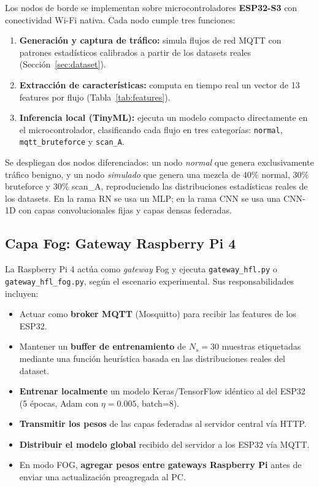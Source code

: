 Los nodos de borde se implementan sobre microcontroladores \textbf{ESP32-S3} con conectividad Wi-Fi nativa. Cada nodo cumple tres funciones:
\begin{enumerate}[noitemsep, topsep=0pt]
    \item \textbf{Generación y captura de tráfico:} simula flujos de red MQTT con patrones estadísticos calibrados a partir de los datasets reales (Sección~\ref{sec:dataset}).
    \item \textbf{Extracción de características:} computa en tiempo real un vector de 13 features por flujo (Tabla~\ref{tab:features}).
    \item \textbf{Inferencia local (TinyML):} ejecuta un modelo compacto directamente en el microcontrolador, clasificando cada flujo en tres categorías: \texttt{normal}, \texttt{mqtt\_bruteforce} y \texttt{scan\_A}.
\end{enumerate}

Se despliegan dos nodos diferenciados: un nodo \emph{normal} que genera exclusivamente tráfico benigno, y un nodo \emph{simulado} que genera una mezcla de 40\% normal, 30\% bruteforce y 30\% scan\_A, reproduciendo las distribuciones estadísticas reales de los datasets. En la rama RN se usa un MLP; en la rama CNN se usa una CNN-1D con capas convolucionales fijas y capas densas federadas.

\subsection{Capa Fog: Gateway Raspberry Pi 4}

La Raspberry Pi 4 actúa como \emph{gateway} Fog y ejecuta \texttt{gateway\_hfl.py} o \texttt{gateway\_hfl\_fog.py}, según el escenario experimental. Sus responsabilidades incluyen:
\begin{itemize}[noitemsep, topsep=0pt]
    \item Actuar como \textbf{broker MQTT} (Mosquitto) para recibir las features de los ESP32.
    \item Mantener un \textbf{buffer de entrenamiento} de $N_s = 30$ muestras etiquetadas mediante una función heurística basada en las distribuciones reales del dataset.
    \item \textbf{Entrenar localmente} un modelo Keras/TensorFlow idéntico al del ESP32 (5 épocas, Adam con $\eta=0.005$, batch=8).
    \item \textbf{Transmitir los pesos} de las capas federadas al servidor central vía HTTP.
    \item \textbf{Distribuir el modelo global} recibido del servidor a los ESP32 vía MQTT.
    \item En modo FOG, \textbf{agregar pesos entre gateways Raspberry Pi} antes de enviar una actualización preagregada al PC.
\end{itemize}

